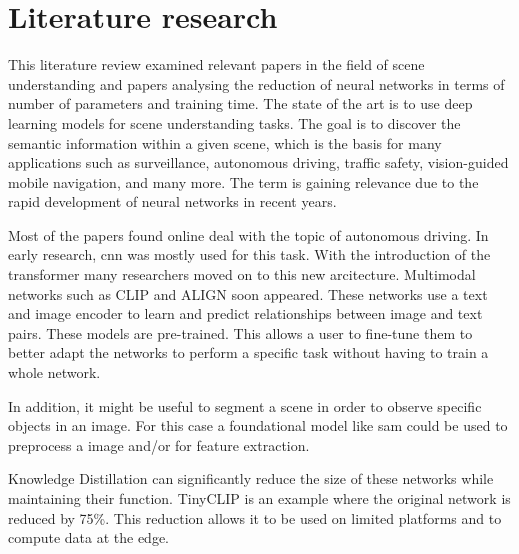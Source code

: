 \chapter{Literature research}

This literature review examined relevant papers in the field of scene understanding and papers analysing the reduction of neural networks in terms of number of parameters and training time.
The state of the art is to use deep learning models for scene understanding tasks.
The goal is to discover the semantic information within a given scene, which is the basis for many applications such as surveillance, autonomous driving, traffic safety, vision-guided mobile navigation, and many more.
The term is gaining relevance due to the rapid development of neural networks in recent years.

Most of the papers found online deal with the topic of autonomous driving\cite{sceneunderstandingautdriving1}.
In early research, \acrfull{cnn}\cite{SegNet} was mostly used for this task.
With the introduction of the transformer \cite{attentionisallyouneed} many researchers moved on to this new arcitecture.
Multimodal networks such as CLIP\cite{clip} and ALIGN\cite{ALIGN} soon appeared.
These networks use a text and image encoder to learn and predict relationships between image and text pairs.
These models are pre-trained.
This allows a user to fine-tune them to better adapt the networks to perform a specific task without having to train a whole network.

In addition, it might be useful to segment a scene in order to observe specific objects in an image.
For this case a foundational model like \Acrfull{sam}\cite{sam} could be used to preprocess a image and/or for feature extraction.

Knowledge Distillation can significantly reduce the size of these networks while maintaining their function.
TinyCLIP\cite{tinyclip} is an example where the original network is reduced by 75\%.
This reduction allows it to be used on limited platforms and to compute data at the edge.


